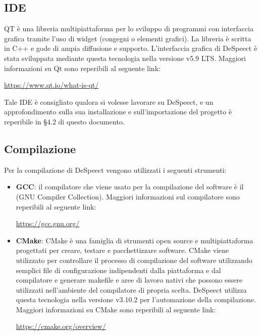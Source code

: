 \documentclass[openany,12pt,a4paper]{report}
\begin{document}
	\subsection{IDE}
	
	QT è una libreria multipiattaforma per lo sviluppo di programmi con interfaccia grafica tramite l'uso di widget (congegni o elementi grafici). La libreria è scritta in C++ e gode di ampia diffusione e supporto. L'interfaccia grafica di DeSpeect è stata sviluppata mediante questa tecnologia nella versione v5.9 LTS. Maggiori informazioni su Qt sono reperibili al seguente link:
	\begin{center}
	\centerline{\url{https://www.qt.io/what-is-qt/}}
	\end{center}
	Tale \gls{IDE} è consigliato qualora si volesse lavorare su DeSpeect, e un approfondimento sulla sua installazione e sull'importazione del progetto è reperibile in §4.2 di questo documento. 
	
	\subsection{Compilazione}
	
	Per la compilazione di DeSpeect vengono utilizzati i seguenti strumenti:
	
	\begin{itemize}
	\item \textbf{GCC}: il compilatore che viene usato per la compilazione del software è il  (GNU Compiler Collection). Maggiori informazioni sul compilatore sono reperibili al seguente link:
	\begin{center}
		\centerline{\url{https://gcc.gnu.org/}}
	\end{center}
	
	\item \textbf{CMake}: CMake è una famiglia di strumenti open source e multipiattaforma progettati per creare, testare e pacchettizzare software. CMake viene utilizzato per controllare il processo di compilazione del software utilizzando semplici file di configurazione indipendenti dalla piattaforma e dal compilatore e generare makefile e aree di lavoro nativi che possono essere utilizzati nell'ambiente del compilatore di propria scelta. DeSpeect utilizza questa tecnologia nella versione v3.10.2 per l’automazione della compilazione. Maggiori informazioni su CMake sono reperibili al seguente link:
	\begin{center}
		\centerline{\url{https://cmake.org/overview/}}
	\end{center}
	
	\end{itemize}
	
\end{document}
